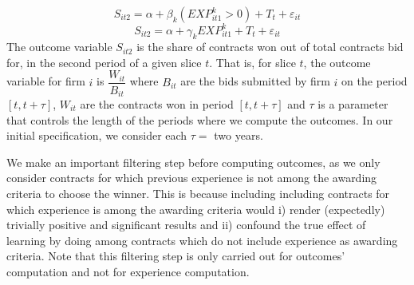 \begin{equation}
  \label{eqn:olsspec1}
S_{it2}=\alpha+ \beta_{k} (EXP^k_{it1}>0)+T_t+\varepsilon_{it}
\end{equation}
\begin{equation}
\label{eqn:olsspec2}
S_{it2}=\alpha+ \gamma_{k} EXP^k_{it1}+T_t+\varepsilon_{it}
\end{equation}
The outcome variable $S_{it2}$ is the share of contracts won out of total contracts bid for, in the second period of a given slice $t$. That is, for slice $t$, the outcome variable for firm $i$ is $\dfrac{W_{it}}{B_{it}}$ where $B_{it}$ are the bids submitted by firm $i$ on the period $[t,t+\tau]$, $W_{it}$ are the contracts won in period $[t,t+\tau]$ and $\tau$ is a parameter that controls the length of the periods where we compute the outcomes. In our initial specification, we consider each $\tau=$ two years. %

We make an important filtering step before computing outcomes, as we only consider contracts for which previous experience is not among the awarding criteria to choose the winner. This is because including including contracts for which experience is among the awarding criteria would i) render (expectedly) trivially positive and significant results and ii) confound the true effect of learning by doing among contracts which do not include experience as awarding criteria. Note that this filtering step is only carried out for outcomes' computation and not for experience computation.


